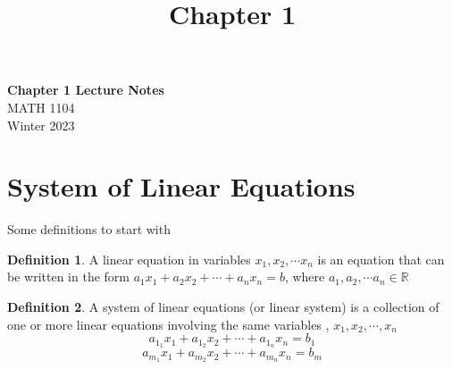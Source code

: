 \documentclass[11pt]{article}
\theoremstyle{definition}
\newtheorem{defn}{Definition}
\newcommand\chaptercounter{1}
\begin{document}
\title{Chapter \chaptercounter}
\thispagestyle{empty}

\begin{center}
{\LARGE \bf Chapter {\chaptercounter \hspace{0}} Lecture Notes}\\
{\large MATH 1104}\\
Winter 2023
\end{center}

\section{System of Linear Equations}
Some definitions to start with

\begin{defn}
A linear equation in variables $x_1, x_2, \cdots x_n$ is an equation that can be written in the form $a_1 x_1 + a_2 x_2 + \cdots + a_n x_n = b$, where $a_1, a_2, \cdots a_n \in \mathbb{R}$
\end{defn}

\begin{defn}
A system of linear equations (or linear system) is a collection of one or more linear equations involving the same variables , $x_1,x_2, \cdots, x_n$
$$a_{1_1} x_1 + a_{1_2} x_2 + \cdots + a_{1_n} x_n = b_1$$
$$a_{m_1} x_1 + a_{m_2} x_2 + \cdots + a_{m_n} x_n = b_m$$
\end{defn}
\end{document}
